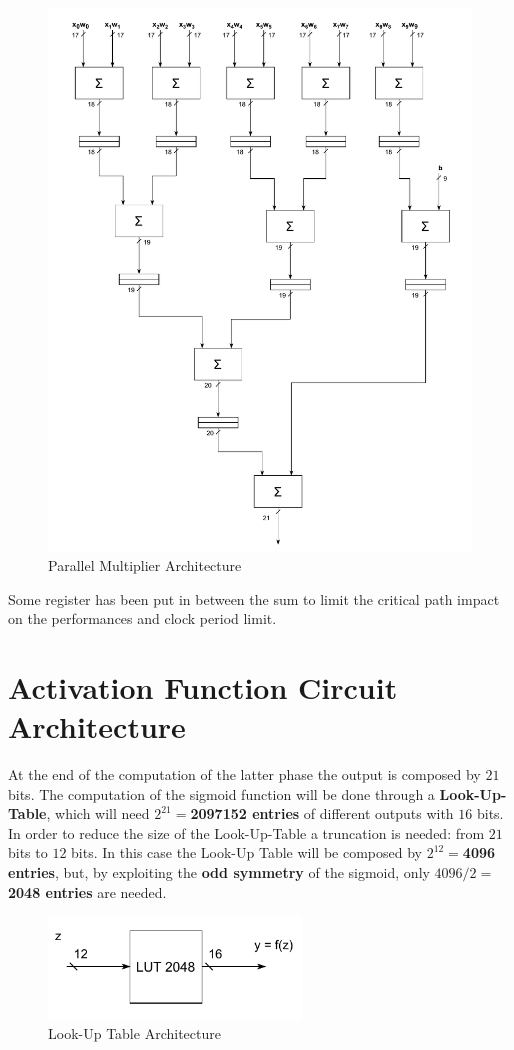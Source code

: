 \begin{figure}[H]
	\centering
	\includegraphics[width=\textwidth]{img/architecture_adder_tree.pdf}
	\caption{Parallel Multiplier Architecture}
\end{figure}

Some register has been put in between the sum to limit the critical path impact on the performances and clock period limit.
\section{Activation Function Circuit Architecture}
At the end of the computation of the latter phase the output is composed by $21$ bits. The computation of the sigmoid function will be done through a \textbf{Look-Up-Table}, which will need \textbf{$2^{21} = $2097152 entries} of different outputs with $16$ bits. In order to reduce the size of the Look-Up-Table a truncation is needed: from $21$ bits to $12$ bits. In this case the Look-Up Table will be composed by \textbf{$2^{12} = $4096 entries}, but, by exploiting the \textbf{odd symmetry} of the sigmoid, only \textbf{$4096/2 = $ 2048 entries} are needed.
\begin{figure}[H]
	\centering
	\includegraphics[width=0.6\textwidth]{img/architecture_lut_optimized.pdf}
	\caption{Look-Up Table Architecture}
\end{figure}
 